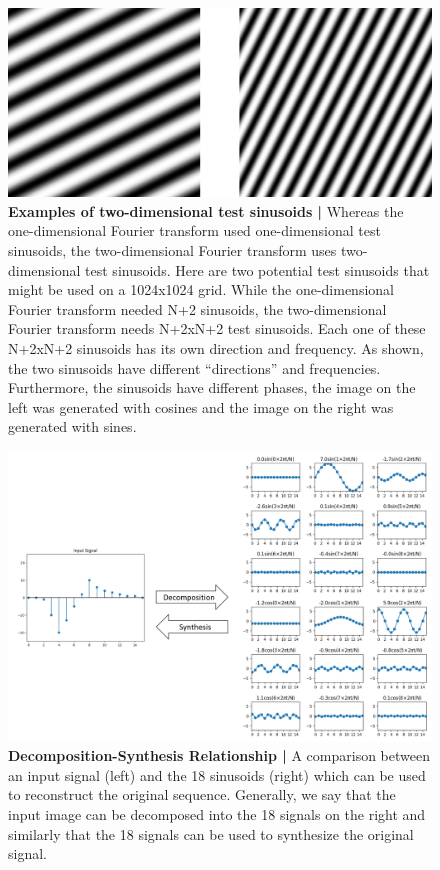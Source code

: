 \documentclass[12pt,a4paper]{article}
\begin{document}
\begin{figure}
\centering
\includegraphics[width=\textwidth]{_images/TwoTestSinusoids.png}
\caption{\textbf{ Examples of two-dimensional test sinusoids |} Whereas the one-dimensional Fourier transform used one-dimensional test sinusoids, the two-dimensional Fourier transform uses two-dimensional test sinusoids. Here are two potential test sinusoids that might be used on a 1024x1024 grid. While the one-dimensional Fourier transform needed N+2 sinusoids, the two-dimensional Fourier transform needs N+2xN+2 test sinusoids. Each one of these N+2xN+2 sinusoids has its own direction and frequency. As shown, the two sinusoids have different ``directions'' and frequencies. Furthermore, the sinusoids have different phases, the image on the left was generated with cosines and the image on the right was generated with sines.}
\end{figure}


\begin{figure}
\centering
\includegraphics[width=\textwidth]{_images/DecompSynth.png}
\caption{\textbf{ Decomposition-Synthesis Relationship |} A comparison between an input signal (left) and the 18 sinusoids (right) which can be used to reconstruct the original sequence. Generally, we say that the input image can be decomposed into the 18 signals on the right and similarly that the 18 signals can be used to synthesize the original signal. 
}\label{fig:deco}
\end{figure}
\end{document}
